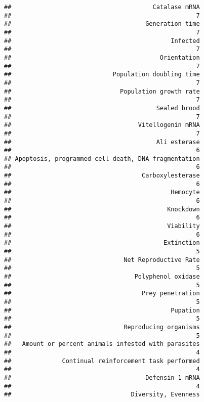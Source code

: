 \documentclass[]{article}
\begin{document}
\begin{verbatim}
##                                       Catalase mRNA 
##                                                   7 
##                                     Generation time 
##                                                   7 
##                                            Infected 
##                                                   7 
##                                         Orientation 
##                                                   7 
##                            Population doubling time 
##                                                   7 
##                              Population growth rate 
##                                                   7 
##                                        Sealed brood 
##                                                   7 
##                                   Vitellogenin mRNA 
##                                                   7 
##                                        Ali esterase 
##                                                   6 
## Apoptosis, programmed cell death, DNA fragmentation 
##                                                   6 
##                                    Carboxylesterase 
##                                                   6 
##                                            Hemocyte 
##                                                   6 
##                                           Knockdown 
##                                                   6 
##                                           Viability 
##                                                   6 
##                                          Extinction 
##                                                   5 
##                               Net Reproductive Rate 
##                                                   5 
##                                  Polyphenol oxidase 
##                                                   5 
##                                    Prey penetration 
##                                                   5 
##                                            Pupation 
##                                                   5 
##                               Reproducing organisms 
##                                                   5 
##   Amount or percent animals infested with parasites 
##                                                   4 
##              Continual reinforcement task performed 
##                                                   4 
##                                     Defensin 1 mRNA 
##                                                   4 
##                                 Diversity, Evenness 

\end{verbatim}
\end{document}
